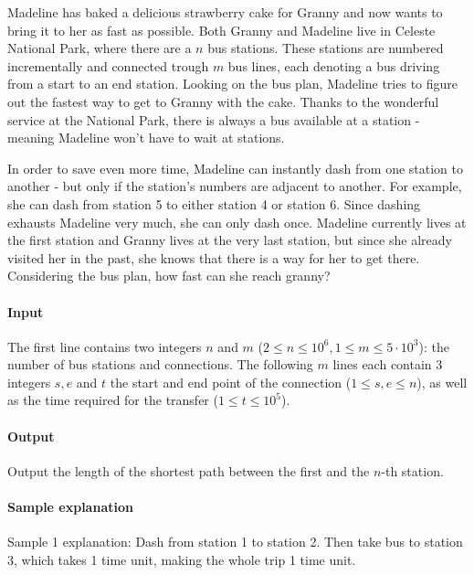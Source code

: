 



\makeheader

Madeline has baked a delicious strawberry cake for Granny and now wants to bring it to her as fast as possible.
Both Granny and Madeline live in Celeste National Park, where there are a $n$ bus stations.
These stations are numbered incrementally and connected trough $m$ bus lines, each denoting a bus driving from a start to an end station.
Looking on the bus plan, Madeline tries to figure out the fastest way to get to Granny with the cake.
Thanks to the wonderful service at the National Park, there is always a bus available at a station - meaning Madeline won't have to wait at stations.


In order to save even more time, Madeline can instantly dash from one station to another - but only if the station's numbers are adjacent to another.
For example, she can dash from station 5 to either station 4 or station 6.
Since dashing exhausts Madeline very much, she can only dash once.
Madeline currently lives at the first station and Granny lives at the very last station, but since she already visited her in the past, she knows that there is a way for her to get there.
Considering the bus plan, how fast can she reach granny?

\paragraph*{Input}

The first line contains two integers $n$ and $m$ ($2 \leq n \leq 10^6, 1 \leq m \leq 5 \cdot 10^3$): the number of bus stations and connections.
The following $m$ lines each contain 3 integers $s,e$ and $t$ the start and end point of the connection ($1 \leq s,e \leq n$), as well as the time required for the transfer ($1 \leq t \leq 10^5$).

\paragraph*{Output}

Output the length of the shortest path between the first and the $n$-th station.

\begin{samples}
\end{samples}

\paragraph*{Sample explanation}

Sample 1 explanation: Dash from station 1 to station 2. Then take bus to station 3, which takes 1 time unit, making the whole trip 1 time unit.

